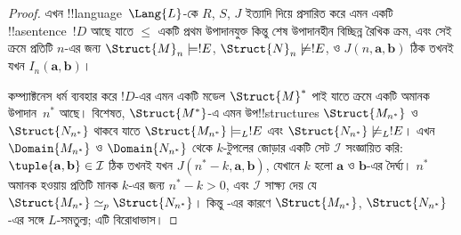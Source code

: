 \documentclass[../../../include/open-logic-section]{subfiles}
\begin{document}
\begin{proof}
এখন !!{language}~$\Lang{L}$-কে $R$, $S$, $J$ ইত্যাদি দিয়ে প্রসারিত
করে এমন একটি !!a{sentence}~$!D$ আছে যাতে $\le$ একটি প্রথম উপাদানযুক্ত
কিন্তু শেষ উপাদানহীন বিচ্ছিন্ন রৈখিক ক্রম, এবং সেই ক্রমে প্রতিটি $n$-এর
জন্য $\Struct{M}_n \models !E$, $\Struct{N}_n \not\models !E$, ও
$J(n, \mathbf{a}, \mathbf{b})$ ঠিক তখনই যখন
$I_n(\mathbf{a}, \mathbf{b})$।

কম্প্যাক্টনেস ধর্ম ব্যবহার করে $!D$-এর এমন একটি মডেল
$\Struct{M}^*$ পাই যাতে ক্রমে একটি অমানক উপাদান~$n^*$ আছে। বিশেষত,
$\Struct{M^*}$-এ এমন উপ!!{structure}s $\Struct{M_{n^*}}$ ও
$\Struct{N_{n^*}}$ থাকবে যাতে $\Struct{M_{n^*}}
\models_L !E$ এবং $\Struct{N_{n^*}} \not\models_L !E$। এখন
$\Domain{M_{n^*}}$ ও $\Domain{N_{n^*}}$ থেকে $k$-টুপলের জোড়ার একটি
সেট $\mathcal{I}$ সংজ্ঞায়িত করি: $\tuple{\mathbf{a}, \mathbf{b}}
\in \mathcal{I}$ ঠিক তখনই যখন $J(n^*-k, \mathbf{a}, \mathbf{b})$,
যেখানে $k$ হলো $\mathbf{a}$ ও $\mathbf{b}$-এর দৈর্ঘ্য। $n^*$ অমানক
হওয়ায় প্রতিটি মানক $k$-এর জন্য $n^* - k >0$, এবং
$\mathcal{I}$ সাক্ষ্য দেয় যে $\Struct{M_{n^*}} \simeq_p
\Struct{N_{n^*}}$। কিন্তু -এর কারণে
$\Struct{M_{n^*}}$, $\Struct{N_{n^*}}$-এর সঙ্গে $L$-সমতুল্য; এটি
বিরোধাভাস।
\end{proof}
\end{document}
